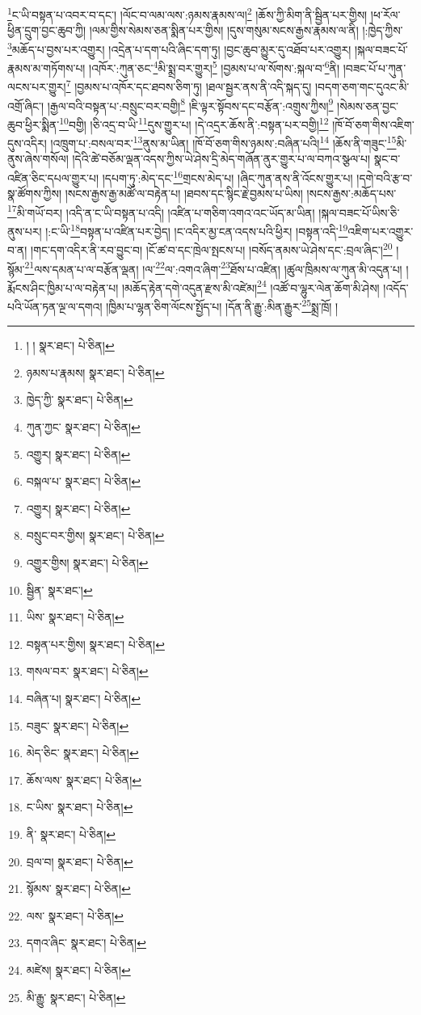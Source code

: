 \footnote{། །  སྣར་ཐང་།  པེ་ཅིན། }ང་ཡི་བསྟན་པ་འབར་བ་དང་། །ལོང་བ་ལམ་ལས་:ཉམས་རྣམས་ལ།\footnote{ཉམས་པ་རྣམས།  སྣར་ཐང་།  པེ་ཅིན། } །ཆོས་ཀྱི་མིག་ནི་སྦྱིན་པར་གྱིས། །ཕ་རོལ་ཕྱིན་དྲུག་བྱང་ཆུབ་ཀྱི། །ལམ་གྱིས་སེམས་ཅན་སྨིན་པར་གྱིས། །དུས་གསུམ་སངས་རྒྱས་རྣམས་ལ་ནི། །:ཁྱེད་ཀྱིས་\footnote{ཁྱེད་ཀྱི་  སྣར་ཐང་།  པེ་ཅིན། }མཆོད་པ་བྱས་པར་འགྱུར། །འདྲེན་པ་དག་པའི་ཞིང་དག་ཏུ། །བྱང་ཆུབ་མྱུར་དུ་འཐོབ་པར་འགྱུར། །སྐལ་བཟང་པོ་རྣམས་མ་གཏོགས་པ། །འཁོར་:ཀུན་ཅང་\footnote{ཀུན་ཀྱང་  སྣར་ཐང་།  པེ་ཅིན། }མི་སྨྲ་བར་གྱུར།\footnote{འགྱུར།  སྣར་ཐང་།  པེ་ཅིན། } །བྱམས་པ་ལ་སོགས་:སྐལ་བ་\footnote{བསྐལ་པ་  སྣར་ཐང་།  པེ་ཅིན། }ནི། །བཟང་པོ་པ་ཀུན་ལངས་པར་གྱུར།\footnote{འགྱུར།  སྣར་ཐང་།  པེ་ཅིན། } །བྱམས་པ་འཁོར་དང་ཐབས་ཅིག་ཏུ། །ཐལ་སྦྱར་ནས་ནི་འདི་སྐད་དུ། །བདག་ཅག་གང་དུའང་མི་འགྲོ་ཞིང་། །རྒྱལ་བའི་བསྟན་པ་:བསྲུང་བར་བགྱི།\footnote{བསྲུང་བར་གྱིས།  སྣར་ཐང་།  པེ་ཅིན། } །ཇི་ལྟར་སྟོབས་དང་བརྩོན་:འགྲུས་ཀྱིས།\footnote{འགྱུར་གྱིས།  སྣར་ཐང་།  པེ་ཅིན། } །སེམས་ཅན་བྱང་ཆུབ་ཕྱིར་སྨིན་\footnote{སྦྱིན་  སྣར་ཐང་། }བགྱི། །ཅི་འདྲ་བ་ཡི་\footnote{ཡིས་  སྣར་ཐང་།  པེ་ཅིན། }དུས་གྱུར་པ། །དེ་འདྲར་ཆོས་ནི་:བསྟན་པར་བགྱི།\footnote{བསྟན་པར་གྱིས།  སྣར་ཐང་།  པེ་ཅིན། } །ཁོ་བོ་ཅག་གིས་འཇིག་དུས་འདིར། །འཁྲུག་པ་:བསལ་བར་\footnote{གསལ་བར་  སྣར་ཐང་།  པེ་ཅིན། }ནུས་མ་ཡིན། །ཁོ་བོ་ཅག་གིས་ཉམས་:བཞིན་པའི།\footnote{བཞིན་པ།  སྣར་ཐང་།  པེ་ཅིན། } །ཆོས་ནི་གཟུང་\footnote{བཟུང་  སྣར་ཐང་།  པེ་ཅིན། }མི་ནུས་ཞེས་གསོལ། །དེའི་ཚེ་བཅོམ་ལྡན་འདས་ཀྱིས་ཡེ་ཤེས་དྲི་མེད་གཞོན་ནུར་གྱུར་པ་ལ་བཀའ་སྩལ་པ། སྣང་བ་འཛིན་ཅིང་དཔལ་གྱུར་པ། །དཔག་ཏུ་:མེད་དང་\footnote{མེད་ཅིང་  སྣར་ཐང་།  པེ་ཅིན། }གྲངས་མེད་པ། །ཞིང་ཀུན་ནས་ནི་འོངས་གྱུར་པ། །དགེ་བའི་རྩ་བ་སྣ་ཚོགས་ཀྱིས། །སངས་རྒྱས་རྒྱ་མཚོ་ལ་བརྟེན་པ། །ཐབས་དང་སྙིང་རྗེ་བྱམས་པ་ཡིས། །སངས་རྒྱས་:མཆོད་པས་\footnote{ཆོས་ལས་  སྣར་ཐང་།  པེ་ཅིན། }མི་གཡོ་བར། །འདི་ན་ང་ཡི་བསྟན་པ་འདི། །འཛིན་པ་གཅིག་འགའ་འང་ཡོད་མ་ཡིན། །སྐལ་བཟང་པོ་ཡིས་ཅི་ནུས་པར། །:ང་ཡི་\footnote{ང་ཡིས་  སྣར་ཐང་།  པེ་ཅིན། }བསྟན་པ་འཛིན་པར་བྱེད། །ང་འདིར་མྱ་ངན་འདས་པའི་ཕྱིར། །བསྟན་འདི་\footnote{ནི་  སྣར་ཐང་།  པེ་ཅིན། }འཇིག་པར་འགྱུར་བ་ན། །གང་དག་འདིར་ནི་རབ་བྱུང་བ། །ངོ་ཚ་བ་དང་ཁྲེལ་སྤངས་པ། །བསོད་ནམས་ཡེ་ཤེས་དང་:བྲལ་ཞིང་།\footnote{བྲལ་བ།  སྣར་ཐང་།  པེ་ཅིན། } །སྙོམ་\footnote{སྙོམས་  སྣར་ཐང་།  པེ་ཅིན། }ལས་དམན་པ་ལ་བརྩོན་ལྡན། །ལ་\footnote{ལས་  སྣར་ཐང་།  པེ་ཅིན། }ལ་:འགའ་ཞིག་\footnote{དགའ་ཞིང་  སྣར་ཐང་།  པེ་ཅིན། }ཐོས་པ་འཛིན། །ཚུལ་ཁྲིམས་ལ་ཀུན་མི་འདུན་པ། །རྨོངས་ཤིང་ཁྱིམ་པ་ལ་བརྟེན་པ། །མཆོད་རྟེན་དགེ་འདུན་རྫས་མི་འཛེམ།\footnote{མཛེས།  སྣར་ཐང་།  པེ་ཅིན། } །འཚོ་བ་ལྷུར་ལེན་ཆོག་མི་ཤེས། །འདོད་པའི་ཡོན་ཏན་ལྔ་ལ་དགའ། །ཁྱིམ་པ་ལྷན་ཅིག་ལོངས་སྤྱོད་པ། །དོན་ནི་རྒྱུ་:མིན་རྒྱུར་\footnote{མི་རྒྱུ་  སྣར་ཐང་།  པེ་ཅིན། }སྨྲ་ཁྲོ། །
